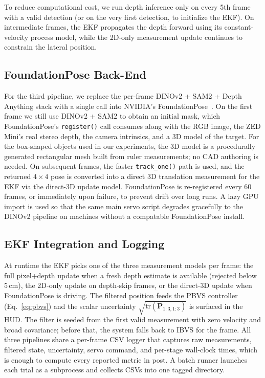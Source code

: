 \documentclass[letterpaper, 10 pt, conference]{ieeeconf}  %
\begin{document}
To reduce computational cost, we run depth inference only on every 5th frame with a valid detection (or on the very first detection, to initialize the EKF). On intermediate frames, the EKF propagates the depth forward using its constant-velocity process model, while the 2D-only measurement update continues to constrain the lateral position.

\subsection{FoundationPose Back-End}

For the third pipeline, we replace the per-frame DINOv2 + SAM2 + Depth Anything stack with a single call into NVIDIA's FoundationPose~\cite{foundationpose}. On the first frame we still use DINOv2 + SAM2 to obtain an initial mask, which FoundationPose's \texttt{register()} call consumes along with the RGB image, the ZED Mini's real stereo depth, the camera intrinsics, and a 3D model of the target. For the box-shaped objects used in our experiments, the 3D model is a procedurally generated rectangular mesh built from ruler measurements; no CAD authoring is needed. On subsequent frames, the faster \texttt{track\_one()} path is used, and the returned $4 \times 4$ pose is converted into a direct 3D translation measurement for the EKF via the direct-3D update model. FoundationPose is re-registered every 60 frames, or immediately upon failure, to prevent drift over long runs. A lazy GPU import is used so that the same main servo script degrades gracefully to the DINOv2 pipeline on machines without a compatable FoundationPose install.

\subsection{EKF Integration and Logging}

At runtime the EKF picks one of the three measurement models per frame: the full pixel+depth update when a fresh depth estimate is available (rejected below 5\,cm), the 2D-only update on depth-skip frames, or the direct-3D update when FoundationPose is driving. The filtered position feeds the PBVS controller (Eq.~\ref{eq:pbvs}) and the scalar uncertainty $\sqrt{\text{tr}(\mathbf{P}_{1:3,1:3})}$ is surfaced in the HUD. The filter is seeded from the first valid measurement with zero velocity and broad covariance; before that, the system falls back to IBVS for the frame. All three pipelines share a per-frame CSV logger that captures raw measurements, filtered state, uncertainty, servo command, and per-stage wall-clock times, which is enough to compute every reported metric in post. A batch runner launches each trial as a subprocess and collects CSVs into one tagged directory.
\end{document}
